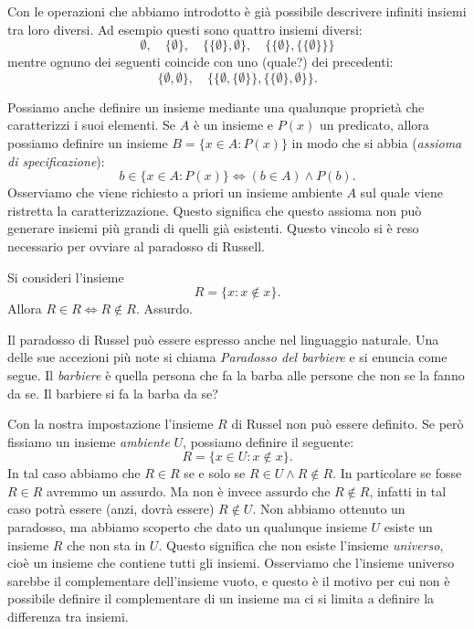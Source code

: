 \documentclass[italian,a4paper,hidelinks,headinclude]{scrartcl}
\newcommand{\myemph}[1]{\emph{#1}\marginpar{#1}}
\begin{document}
Con le operazioni che abbiamo introdotto è già possibile descrivere infiniti insiemi
tra loro diversi. Ad esempio questi sono quattro insiemi diversi:
\[
 \emptyset,\quad
 \{ \emptyset \},\quad
 \{\{\emptyset\}, \emptyset\},\quad
 \{\{\emptyset\}, \{\{\emptyset\}\}\}
\]
mentre ognuno dei seguenti coincide con uno (quale?) dei precedenti:
\[
 \{\emptyset, \emptyset\},\quad
 \{\{\emptyset, \{\emptyset\}\}, \{\{\emptyset\}, \emptyset\}\}.
\]

Possiamo anche definire un insieme mediante una qualunque
proprietà che caratterizzi
i suoi elementi. Se $A$ è un insieme e $P(x)$ un predicato, allora
possiamo definire un insieme $B = \{x\in A\colon P(x)\}$ in modo
che si abbia
(\myemph{assioma di specificazione}):
\[
  b \in \{x\in A \colon P(x)\} \iff (b \in A) \wedge P(b).
\]
Osserviamo che viene richiesto a priori un insieme ambiente $A$ sul quale
viene ristretta la caratterizzazione. Questo significa che questo assioma non
può generare insiemi più grandi di quelli già esistenti.
Questo vincolo si è reso necessario per ovviare al paradosso di Russell.

\begin{paradox}[Russel]
Si consideri l'insieme
\[
  R = \{ x\colon x \not\in x\}.
\]
Allora $R\in R \iff R\not \in R$. Assurdo.
\end{paradox}

Il paradosso di Russel può essere espresso anche nel linguaggio naturale.
Una delle sue accezioni più note si chiama \emph{Paradosso del barbiere}
e si enuncia come segue. Il \emph{barbiere} è quella persona che fa la barba
alle persone che non se la fanno da se. Il barbiere si fa la barba da se?

Con la nostra impostazione l'insieme $R$ di Russel non può essere definito.
Se però fissiamo un insieme \emph{ambiente} $U$, possiamo definire il seguente:
\[
  R = \{ x \in U \colon x \not \in x\}.
\]
In tal caso abbiamo che $R\in R$ se e solo se $R\in U \wedge R\not \in R$.
In particolare se fosse $R\in R$ avremmo un assurdo. Ma non è invece
assurdo che $R\not \in R$, infatti in tal caso potrà essere (anzi, dovrà essere)
$R\not \in U$.
Non abbiamo ottenuto un paradosso, ma abbiamo scoperto che dato
un qualunque insieme $U$ esiste un insieme $R$ che non sta in $U$.
Questo significa che non esiste l'insieme \myemph{universo}, cioè un insieme che
contiene tutti gli insiemi. Osserviamo che l'insieme universo sarebbe il complementare
dell'insieme vuoto, e questo è il motivo per cui non è possibile definire
il complementare di un insieme ma ci si limita a definire la differenza tra insiemi.
\end{document}
